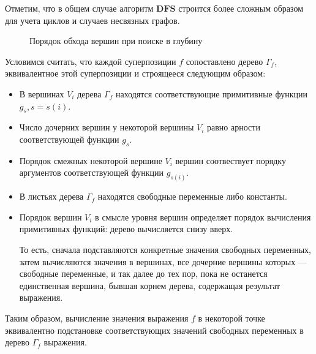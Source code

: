 \documentclass[12pt,a4paper]{amsart}
\begin{document}
Отметим, что в общем случае алгоритм $\mathbf{DFS}$ строится более сложным
образом для учета циклов и случаев несвязных графов.

\begin{figure}[H]
  \caption{Порядок обхода вершин при поиске в глубину}
\end{figure}

Условимся считать, что каждой суперпозиции $f$ сопоставлено дерево $\Gamma_f$,
эквивалентное этой суперпозиции и строящееся следующим образом:

\begin{itemize}
  \item В вершинах $V_i$ дерева $\Gamma_f$ находятся соответствующие
	примитивные функции $g_s, s = s(i)$.
  \item Число дочерних вершин у некоторой вершины $V_i$ равно арности
	соответствующей функции $g_s$.
  \item Порядок смежных некоторой вершине $V_i$ вершин соотвествует порядку
	аргументов соответствующей функции $g_{s(i)}$.
  \item В листьях дерева $\Gamma_f$ находятся свободные переменные либо
	константы.
  \item Порядок вершин $V_i$ в смысле уровня вершин определяет порядок
	вычисления примитивных функций: дерево вычисляется снизу вверх.
	
	То есть, сначала подставляются конкретные значения свободных переменных,
	затем вычисляются значения в вершинах, все дочерние вершины которых ---
	свободные переменные, и так далее до тех пор, пока не останется
	единственная вершина, бывшая корнем дерева, содержащая результат выражения.
\end{itemize}

Таким образом, вычисление значения выражения $f$ в некоторой точке эквивалентно
подстановке соответствующих значений свободных переменных в дерево $\Gamma_f$
выражения.
\end{document}
